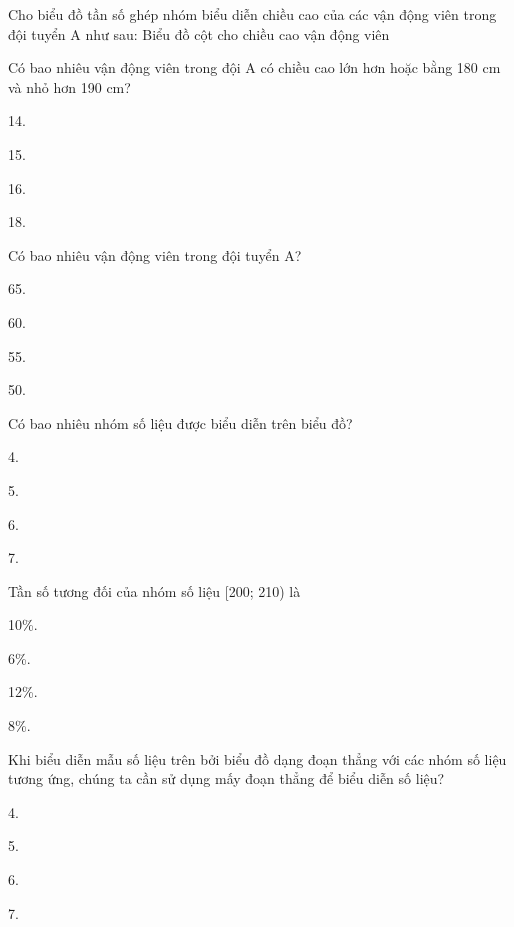 \documentclass[%
    fontsize=12pt,%
    chapterprefix=false,%
    open=right,%
    twoside=false,%
    numbers=noenddot,%
    headings=optiontohead,%
    final,%
    DIV=15,%
    parskip=half %
]{scrbook}
\begin{document}
\begin{tracnghiem}
\item Cho biểu đồ tần số ghép nhóm biểu diễn chiều cao của các vận động viên trong đội tuyển A như sau: Biểu đồ cột cho chiều cao vận động viên

\item Có bao nhiêu vận động viên trong đội A có chiều cao lớn hơn hoặc bằng 180 cm và nhỏ hơn 190 cm?
\begin{options}
  \item 14.
  \item 15.
  \item 16.
  \item 18.
\end{options}

\item Có bao nhiêu vận động viên trong đội tuyển A?
\begin{options}
  \item 65.
  \item 60.
  \item 55.
  \item 50.
\end{options}

\item Có bao nhiêu nhóm số liệu được biểu diễn trên biểu đồ?
\begin{options}
  \item 4.
  \item 5.
  \item 6.
  \item 7.
\end{options}

\item Tần số tương đối của nhóm số liệu [200; 210) là
\begin{options}
  \item 10\%.
  \item 6\%.
  \item 12\%.
  \item 8\%.
\end{options}

\item Khi biểu diễn mẫu số liệu trên bởi biểu đồ dạng đoạn thẳng với các nhóm số liệu tương ứng, chúng ta cần sử dụng mấy đoạn thẳng để biểu diễn số liệu?
\begin{options}
  \item 4.
  \item 5.
  \item 6.
  \item 7.
\end{options}

\end{tracnghiem}
\end{document}
